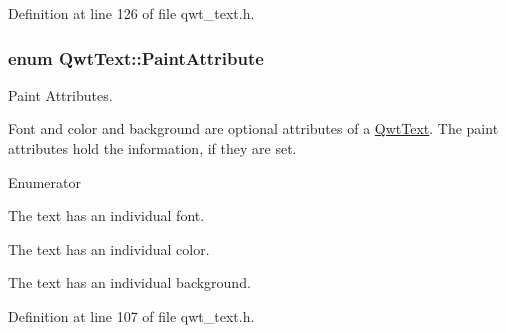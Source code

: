 Definition at line 126 of file qwt\-\_\-text.\-h.

\hypertarget{class_qwt_text_a9739e47ea489e690f121e4b1d27ae24e}{
\subsubsection[{Paint\-Attribute}]{\setlength{\rightskip}{0pt plus 5cm}enum {\bf Qwt\-Text\-::\-Paint\-Attribute}}}\label{class_qwt_text_a9739e47ea489e690f121e4b1d27ae24e}


Paint Attributes. 

Font and color and background are optional attributes of a \hyperlink{class_qwt_text}{Qwt\-Text}. The paint attributes hold the information, if they are set. \begin{Desc}
\item[Enumerator]\par
\begin{description}
\item[{\em 
\hypertarget{class_qwt_text_a9739e47ea489e690f121e4b1d27ae24eac12e48f17fd02a6bc1840c61c4862a65}{Paint\-Using\-Text\-Font}\label{class_qwt_text_a9739e47ea489e690f121e4b1d27ae24eac12e48f17fd02a6bc1840c61c4862a65}
}]The text has an individual font. \item[{\em 
\hypertarget{class_qwt_text_a9739e47ea489e690f121e4b1d27ae24ea1aa48cee0a54089820e77600cf93dc4b}{Paint\-Using\-Text\-Color}\label{class_qwt_text_a9739e47ea489e690f121e4b1d27ae24ea1aa48cee0a54089820e77600cf93dc4b}
}]The text has an individual color. \item[{\em 
\hypertarget{class_qwt_text_a9739e47ea489e690f121e4b1d27ae24ea77dd66b2a65e9998d9803672791e1456}{Paint\-Background}\label{class_qwt_text_a9739e47ea489e690f121e4b1d27ae24ea77dd66b2a65e9998d9803672791e1456}
}]The text has an individual background. \end{description}
\end{Desc}


Definition at line 107 of file qwt\-\_\-text.\-h.

